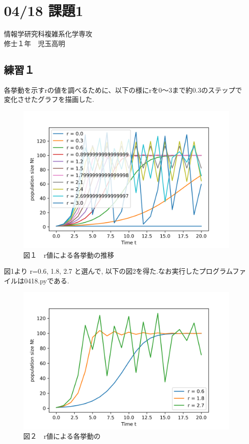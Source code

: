\documentclass{jarticle}
\begin{document}
\section*{04/18 課題1}
\begin{flushright}
	情報学研究科複雑系化学専攻\\
	修士１年　児玉高明
\end{flushright}
\subsection*{練習１}
	各挙動を示すrの値を調べるために、以下の様にrを0〜3まで約0.3のステップで変化させたグラフを描画した.
	\begin{figure}[H]
	\centering
  \includegraphics[width=0.8\linewidth]{prep.png}
	\caption{図１　r値による各挙動の推移}
	\end{figure}
	図1より r=0.6, 1.8, 2.7 と選んで, 以下の図2を得た.なお実行したプログラムファイルは0418.pyである.
	\begin{figure}[H]
	\centering
  \includegraphics[width=0.8\linewidth]{hw1.png}
	\caption{図２　r値による各挙動の}
	\end{figure}
	\newpage
\end{document}
